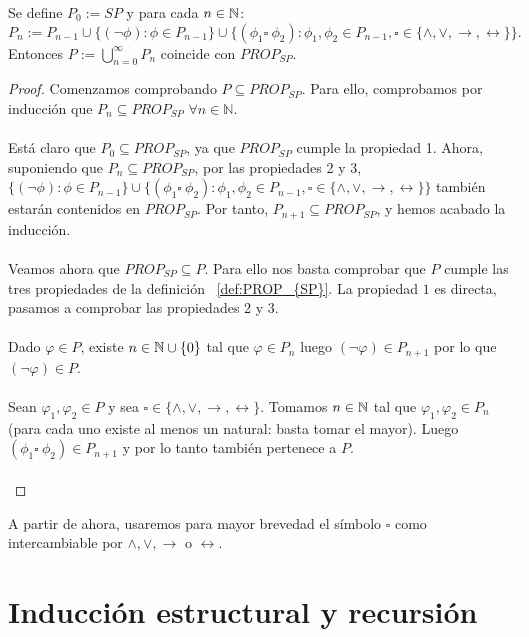 \begin{prop} Se define $P_0 := SP$ y para cada $n\in\mathbb{N}$:
\[
    P_n := P_{n-1} \cup \{(\neg \phi): \phi\in P_{n-1}\}\cup \{ (\phi_1 \square\  \phi_2): \phi_1, \phi_2\in P_{n-1},  \square\in \{\land, \lor, \rightarrow, \leftrightarrow\}\}.
\]
Entonces $P := \bigcup_{n=0}^\infty P_n$ coincide con $PROP_{SP}$.
\begin{proof} 
Comenzamos comprobando $P\subseteq PROP_{SP}$. Para ello, comprobamos por inducción que $P_n\subseteq PROP_{SP}$ $\forall n \in \mathbb{N}$. \\ \\
Está claro que $P_0\subseteq PROP_{SP}$, ya que $PROP_{SP}$ cumple la propiedad 1.
Ahora, suponiendo que $P_n\subseteq PROP_{SP}$, por las propiedades 2 y 3, $\{(\neg \phi): \phi\in P_{n-1}\}\cup \{ (\phi_1 \square\  \phi_2): \phi_1, \phi_2\in P_{n-1},  \square\in \{\land, \lor, \rightarrow, \leftrightarrow\}\}$ también estarán  contenidos en $PROP_{SP}$. Por tanto, $P_{n+1}\subseteq PROP_{SP}$, y hemos acabado la inducción. \\ \\
Veamos ahora que $PROP_{SP}\subseteq P$. Para ello nos basta comprobar que $P$ cumple las tres propiedades de la definición ~\ref{def:PROP_{SP}}. La propiedad $1$ es directa, pasamos a comprobar las propiedades 2 y 3. \\ \\
Dado $\varphi \in P$, existe $n\in \mathbb{N}\cup\{0\}$ tal que $\varphi \in P_n$ luego $(\neg \varphi) \in P_{n+1}$ por lo que $(\neg\varphi) \in P$. \\ \\
Sean $\varphi_1, \varphi_2 \in P$ y sea $\square\in \{\land, \lor, \rightarrow, \leftrightarrow\}$. Tomamos $n\in\mathbb{N}$ tal que $\varphi_1, \varphi_2 \in P_n$ (para cada uno existe al menos un natural: basta tomar el mayor). Luego $(\phi_1 \square\  \phi_2)\in P_{n+1}$ y por lo tanto también pertenece a $P$. \\ \\
\end{proof}
\end{prop}
A partir de ahora, usaremos para mayor brevedad el símbolo $\square$ como intercambiable por $\land, \lor, \rightarrow$ o $\leftrightarrow$.\\
\section{Inducción estructural y recursión}

